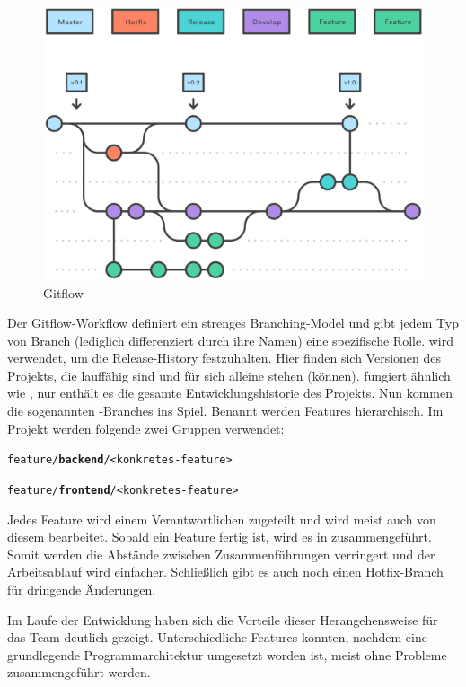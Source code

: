 \begin{figure}[h]
	\includegraphics[width=\columnwidth]{img/gitflow}
	\caption[Gitflow]{Gitflow\footnotemark}
\end{figure}

Der Gitflow-Workflow definiert ein strenges Branching-Model und gibt jedem Typ von Branch (lediglich differenziert durch ihre Namen) eine spezifische Rolle.  wird verwendet, um die Release-History festzuhalten. Hier finden sich Versionen des Projekts, die lauffähig sind und für sich alleine stehen (können).  fungiert ähnlich wie , nur enthält es die gesamte Entwicklungshistorie des Projekts. Nun kommen die sogenannten -Branches ins Spiel. Benannt werden Features hierarchisch. Im Projekt werden folgende zwei Gruppen verwendet: 
\vspace{1em}
\begin{minipage}{\textwidth}
	\texttt{feature/\textbf{backend}/<konkretes-feature>}
	
	\texttt{feature/\textbf{frontend}/<konkretes-feature>}
\end{minipage}
\vspace{1em}
Jedes Feature wird einem Verantwortlichen zugeteilt und wird meist auch von diesem bearbeitet. Sobald ein Feature fertig ist, wird es in  zusammengeführt. Somit werden die Abstände zwischen Zusammenführungen verringert und der Arbeitsablauf wird einfacher. Schließlich gibt es auch noch einen Hotfix-Branch für dringende Änderungen.

Im Laufe der Entwicklung haben sich die Vorteile dieser Herangehensweise für das Team deutlich gezeigt. Unterschiedliche Features konnten, nachdem eine grundlegende Programmarchitektur umgesetzt worden ist, meist ohne Probleme zusammengeführt werden. 

